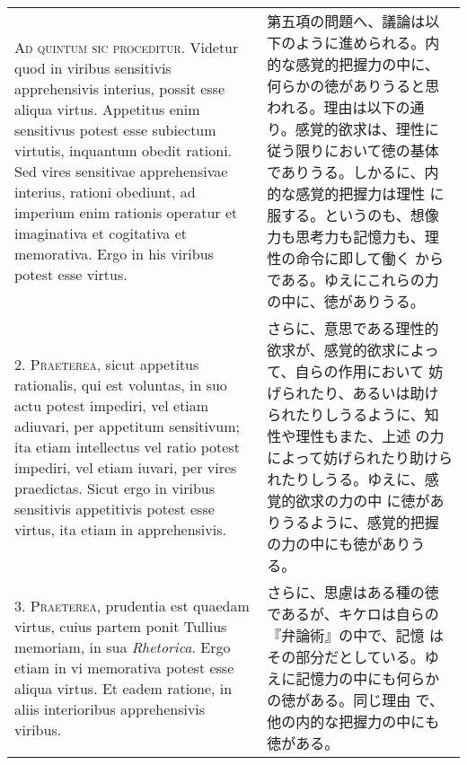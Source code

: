 \documentclass[10pt]{jsarticle}
\begin{document}
\begin{longtable}{p{21em}p{21em}}
{\scshape Ad quintum sic proceditur}. Videtur quod in viribus
sensitivis apprehensivis interius, possit esse aliqua
virtus. Appetitus enim sensitivus potest esse subiectum virtutis,
inquantum obedit rationi. Sed vires sensitivae apprehensivae interius,
rationi obediunt, ad imperium enim rationis operatur et imaginativa et
cogitativa et memorativa. Ergo in his viribus potest esse virtus.

&

第五項の問題へ、議論は以下のように進められる。内的な感覚的把握力の中に、
何らかの徳がありうると思われる。理由は以下の通り。感覚的欲求は、理性に
従う限りにおいて徳の基体でありうる。しかるに、内的な感覚的把握力は理性
に服する。というのも、想像力も思考力も記憶力も、理性の命令に即して働く
からである。ゆえにこれらの力の中に、徳がありうる。
 
 
 
\\



2. {\scshape Praeterea}, sicut appetitus rationalis, qui est voluntas,
in suo actu potest impediri, vel etiam adiuvari, per appetitum
sensitivum; ita etiam intellectus vel ratio potest impediri, vel etiam
iuvari, per vires praedictas. Sicut ergo in viribus sensitivis
appetitivis potest esse virtus, ita etiam in apprehensivis.

&

さらに、意思である理性的欲求が、感覚的欲求によって、自らの作用において
妨げられたり、あるいは助けられたりしうるように、知性や理性もまた、上述
の力によって妨げられたり助けられたりしうる。ゆえに、感覚的欲求の力の中
に徳がありうるように、感覚的把握の力の中にも徳がありうる。
 

\\



3. {\scshape Praeterea}, prudentia est quaedam virtus, cuius partem
ponit Tullius memoriam, in sua {\itshape Rhetorica}. Ergo etiam in vi
memorativa potest esse aliqua virtus. Et eadem ratione, in aliis
interioribus apprehensivis viribus.

&

さらに、思慮はある種の徳であるが、キケロは自らの『弁論術』の中で、記憶
はその部分だとしている。ゆえに記憶力の中にも何らかの徳がある。同じ理由
で、他の内的な把握力の中にも徳がある。
 
\\




\end{longtable}
\end{document}

